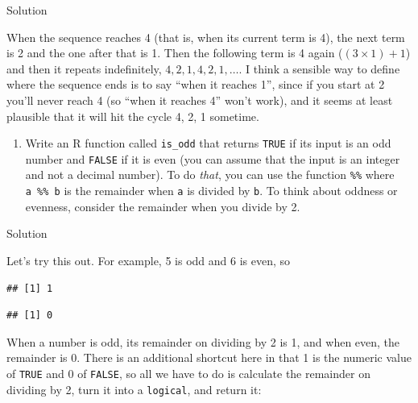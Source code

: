 \documentclass[]{tufte-book}
\newenvironment{Shaded}{}{}
\newcommand{\DecValTok}[1]{\textcolor[rgb]{0.25,0.63,0.44}{#1}}
\newcommand{\OperatorTok}[1]{\textcolor[rgb]{0.40,0.40,0.40}{#1}}
\providecommand{\tightlist}{%
  \setlength{\itemsep}{0pt}\setlength{\parskip}{0pt}}
\theoremstyle{definition}
\theoremstyle{definition}
\theoremstyle{definition}
\theoremstyle{remark}
\begin{document}
Solution

When the sequence reaches 4 (that is, when its current term is 4), the
next term is 2 and the one after that is 1. Then the following term is 4
again (\((3 \times 1)+1\)) and then it repeats indefinitely,
\(4, 2, 1, 4, 2, 1, \ldots\). I think a sensible way to define where the
sequence ends is to say ``when it reaches 1'', since if you start at 2
you'll never reach 4 (so ``when it reaches 4'' won't work), and it seems
at least plausible that it will hit the cycle 4, 2, 1 sometime.

\begin{enumerate}
\def\labelenumi{(\alph{enumi})}
\setcounter{enumi}{1}
\tightlist
\item
  Write an R function called \texttt{is\_odd} that returns \texttt{TRUE}
  if its input is an odd number and \texttt{FALSE} if it is even (you
  can assume that the input is an integer and not a decimal number). To
  do \emph{that}, you can use the function \texttt{\%\%} where
  \texttt{a\ \%\%\ b} is the remainder when \texttt{a} is divided by
  \texttt{b}. To think about oddness or evenness, consider the remainder
  when you divide by 2.
\end{enumerate}

Solution

Let's try this out. For example, 5 is odd and 6 is even, so

\begin{Shaded}
\end{Shaded}

\begin{verbatim}
## [1] 1
\end{verbatim}

\begin{Shaded}
\end{Shaded}

\begin{verbatim}
## [1] 0
\end{verbatim}

When a number is odd, its remainder on dividing by 2 is 1, and when
even, the remainder is 0. There is an additional shortcut here in that 1
is the numeric value of \texttt{TRUE} and 0 of \texttt{FALSE}, so all we
have to do is calculate the remainder on dividing by 2, turn it into a
\texttt{logical}, and return it:
\end{document}
